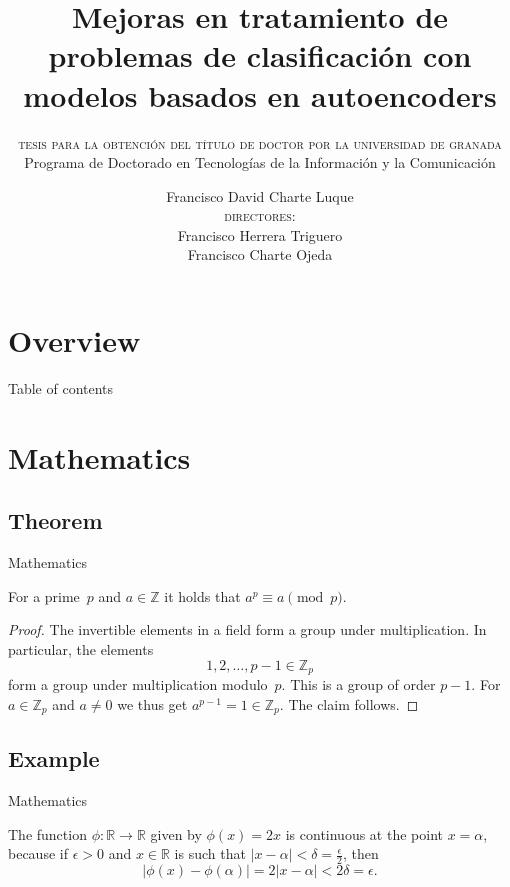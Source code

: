 \documentclass[USenglish, aspectratio = 43]{beamer}
\author[David Charte]
{Francisco David Charte Luque\\[0.6ex]\normalsize\textnormal{\textsc{directores}:}\\Francisco Herrera Triguero\\Francisco Charte Ojeda}
\title[Mejoras en clasificación con autoencoders]{\Large {Mejoras en tratamiento de problemas de} clasificación {con modelos basados en} autoencoders}
\subtitle{\textsc{\normalsize tesis para la obtención del título de doctor por la universidad de granada}\\{\small Programa de Doctorado en Tecnologías de la Información y la Comunicación}}
\begin{document}
\section{Overview}
%
%
\begin{frame}{Table of contents}
    \tableofcontents
\end{frame}

\section{Mathematics}
\subsection{Theorem}


\hidelogo

\begin{frame}{Mathematics}

    \begin{theorem}
        For a prime~\(p\) and \(a \in \mathbb{Z}\) it holds that \(a^p \equiv a \pmod{p}\).
    \end{theorem}

    \begin{proof}
        The invertible elements in a field form a group under multiplication.
        In particular, the elements
        \begin{equation*}
            1, 2, \ldots, p - 1 \in \mathbb{Z}_p
        \end{equation*}
        form a group under multiplication modulo~\(p\).
        This is a group of order \(p - 1\).
        For \(a \in \mathbb{Z}_p\) and \(a \neq 0\) we thus get \(a^{p-1} = 1 \in \mathbb{Z}_p\).
        The claim follows.
    \end{proof}
\end{frame}

\showlogo

\subsection{Example}

\begin{frame}{Mathematics}

    \begin{example}
        The function \(\phi \colon \mathbb{R} \to \mathbb{R}\) given by \(\phi(x) = 2x\) is continuous at the point \(x = \alpha\),
        because if \(\epsilon > 0\) and \(x \in \mathbb{R}\) is such that \(\lvert x - \alpha \rvert < \delta = \frac{\epsilon}{2}\),
        then
        \begin{equation*}
            \lvert \phi(x) - \phi(\alpha)\rvert = 2\lvert x - \alpha \rvert < 2\delta = \epsilon.
        \end{equation*}
    \end{example}
\end{frame}
\end{document}
